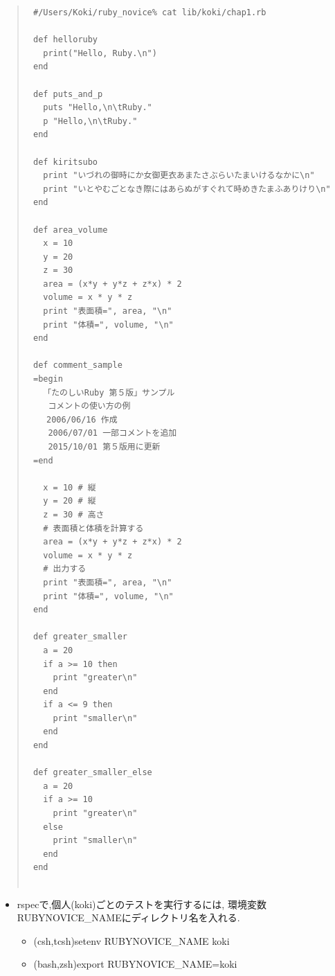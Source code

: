 \begin{quote}\begin{verbatim}
 #/Users/Koki/ruby_novice% cat lib/koki/chap1.rb
 
 def helloruby     
   print("Hello, Ruby.\n")
 end
 
 def puts_and_p
   puts "Hello,\n\tRuby."
   p "Hello,\n\tRuby."
 end
 
 def kiritsubo
   print "いづれの御時にか女御更衣あまたさぶらいたまいけるなかに\n"
   print "いとやむごとなき際にはあらぬがすぐれて時めきたまふありけり\n"
 end
 
 def area_volume
   x = 10
   y = 20
   z = 30
   area = (x*y + y*z + z*x) * 2
   volume = x * y * z
   print "表面積=", area, "\n"
   print "体積=", volume, "\n"
 end
 
 def comment_sample
 =begin                                                                          
   「たのしいRuby 第５版」サンプル                                               
    コメントの使い方の例                                                         
  　2006/06/16 作成                                                              
    2006/07/01 一部コメントを追加                                                
    2015/10/01 第５版用に更新                                                    
 =end
 
   x = 10 # 縦                                                                   
   y = 20 # 縦                                                                   
   z = 30 # 高さ                                                                 
   # 表面積と体積を計算する                                                      
   area = (x*y + y*z + z*x) * 2
   volume = x * y * z
   # 出力する                                                                    
   print "表面積=", area, "\n"
   print "体積=", volume, "\n"
 end
 
 def greater_smaller
   a = 20
   if a >= 10 then
     print "greater\n"
   end
   if a <= 9 then
     print "smaller\n"
   end
 end
 
 def greater_smaller_else
   a = 20
   if a >= 10
     print "greater\n"
   else
     print "smaller\n"
   end
 end
 
\end{verbatim}\end{quote}
\begin{itemize}
\item rspecで,個人(koki)ごとのテストを実行するには, 環境変数RUBYNOVICE\_NAMEにディレクトリ名を入れる.
\begin{itemize}
\item (csh,tcsh)setenv RUBYNOVICE\_NAME koki
\item (bash,zsh)export RUBYNOVICE\_NAME=koki
\end{itemize}
\end{itemize}

